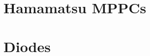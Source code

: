 \documentclass{report}
\begin{document}
	\appendix
	\chapter{Hamamatsu MPPCs}\label{sssec:mppc}
	
	\chapter{Diodes}\label{sssec:diode1}
	
	
	

  	
\end{document}
